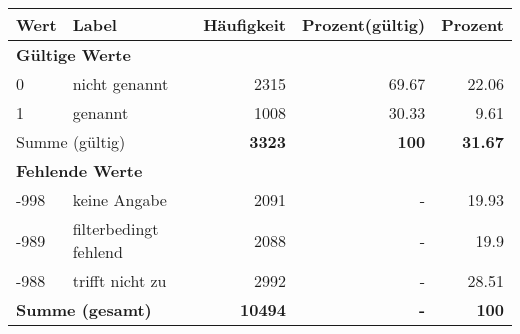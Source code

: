      \begin{longtable}{lXrrr}
     \toprule
     \textbf{Wert} & \textbf{Label} & \textbf{Häufigkeit} & \textbf{Prozent(gültig)} & \textbf{Prozent} \\
     \endhead
     \midrule
     \multicolumn{5}{l}{\textbf{Gültige Werte}}\\

     0 &
     \multicolumn{1}{X}{ nicht genannt   } &


       \num{2315} &
       \num[round-mode=places,round-precision=2]{69,67} &
         \num[round-mode=places,round-precision=2]{22,06} \\

     1 &
     \multicolumn{1}{X}{ genannt   } &


       \num{1008} &
       \num[round-mode=places,round-precision=2]{30,33} &
         \num[round-mode=places,round-precision=2]{9,61} \\
     \midrule
     \multicolumn{2}{l}{Summe (gültig)} &
       \textbf{\num{3323}} &
     \textbf{100} &
       \textbf{\num[round-mode=places,round-precision=2]{31,67}} \\
     \multicolumn{5}{l}{\textbf{Fehlende Werte}}\\
       -998 &
       keine Angabe &
         \num{2091} &
        - &
         \num[round-mode=places,round-precision=2]{19,93} \\
       -989 &
       filterbedingt fehlend &
         \num{2088} &
        - &
         \num[round-mode=places,round-precision=2]{19,9} \\
       -988 &
       trifft nicht zu &
         \num{2992} &
        - &
         \num[round-mode=places,round-precision=2]{28,51} \\
     \midrule
     \multicolumn{2}{l}{\textbf{Summe (gesamt)}} &
          \textbf{\num{10494}} &
        \textbf{-} &
        \textbf{100} \\
     \bottomrule
     \end{longtable}
     
